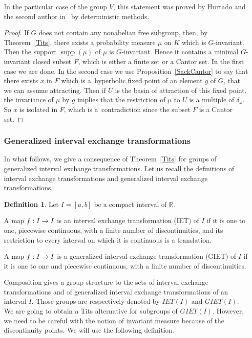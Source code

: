 \documentclass[10pt]{amsart}
\theoremstyle{definition}\newtheorem{defi}[theo]{Definition}\newtheorem{rema}[theo]{Remark}\newtheorem{exam}[theo]{Example}\newtheorem{exem}[theo]{Example}\newtheorem{nota}[theo]{Notation}
\DeclareMathOperator{\supp}{supp}
\newcommand{\R}{\mathbb{R}}
\newcounter{setofcase}
\newcounter{case}[setofcase]
\renewcommand*{\to}{\mathchoice{\longrightarrow}{\rightarrow}{\rightarrow}{\rightarrow}}
\begin{document}
In the particular case of the group $V$, this statement was proved by Hurtado and the second author in~\cite{HM} by deterministic methods.


\begin{proof}
If $G$ does not contain any nonabelian free subgroup, then, by Theorem~\ref{Tits}, there exists a probability measure $\mu$ on $K$ which is $G$-invariant. Then the support $\supp(\mu)$ of $\mu$ is $G$-invariant. Hence it contains a minimal $G$-invariant closed subset $F$, which is either a finite set or a Cantor set. In the first case we are done. In the second case we use Proposition~\ref{SackCantor} to say that there exists $x$ in $F$ which is a~hyperbolic fixed point of an element $g$ of $G$, that we can assume attracting. Then if $U$ is the basin of attraction of this fixed point, the invariance of $\mu$ by $g$ implies that the restriction of $\mu$ to $U$ is a multiple of $\delta_x$. So $x$ is isolated in $F$, which is a~contradiction since the subset $F$ is a Cantor set.
\end{proof}



\subsubsection*{Generalized interval exchange transformations}

In what follows, we give a consequence of Theorem~\ref{Tits} for groups of generalized interval exchange transformations. Let us recall the definitions of interval exchange transformations and generalized interval exchange transformations.



\begin{defi}
Let $I=[a,b]$ be a compact interval of $\R$.

A map $f:I\to I$ is an interval exchange transformation (IET) of $I$ if it is one to one, piecewise continuous, with a finite number of discontinuities, and its restriction to every interval on which it is continuous is a translation.

A map $f:I\to I$ is a generalized interval exchange transformation (GIET) of $I$ if it is one to one and piecewise continuous, with a finite number of discontinuities.
\end{defi}


Composition gives a group structure to the sets of interval exchange transformations and of generalized interval exchange transformations of an interval $I$. Those groups are respectively denoted by $\mathit{IET}(I)$ and $\mathit{GIET}(I)$. We are going to obtain a Tits alternative for subgroups of $\mathit{GIET}(I)$. However, we need to be careful with the notion of invariant measure because of the discontinuity points. We will use the following definition.
\end{document}
